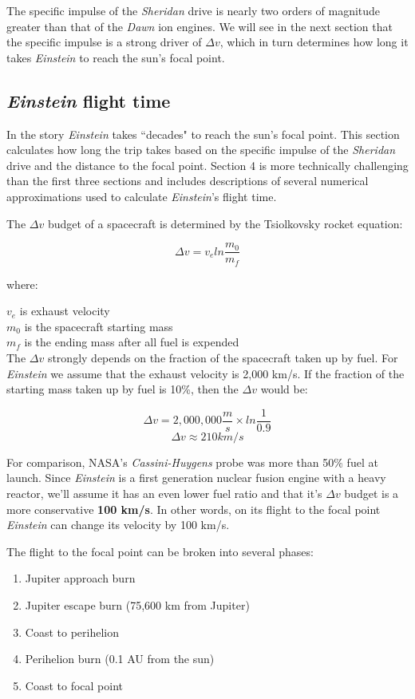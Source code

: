 \documentclass[12pt]{article} %
\begin{document}
The specific impulse of the \textit{Sheridan} drive is nearly two orders of magnitude greater than that of the \textit{Dawn} ion engines. We will see in the next section that the specific impulse is a strong driver of $\Delta v$, which in turn determines how long it takes \textit{Einstein} to reach the sun's focal point.

\subsection{\textit{Einstein} flight time}
\label{subsec: flight time}
In the story \textit{Einstein} takes ``decades" to reach the sun's focal point. This section calculates how long the trip takes based on the specific impulse of the \textit{Sheridan} drive and the distance to the focal point. Section 4 is more technically challenging than the first three sections and includes descriptions of several numerical approximations used to calculate \textit{Einstein}'s flight time.

The $\Delta v$ budget of a spacecraft is determined by the Tsiolkovsky rocket equation:

$$\Delta v = v_e ln \frac{m_0}{m_f}$$

where:

$v_e$ is exhaust velocity\\
$m_0$ is the spacecraft starting mass\\
$m_f$ is the ending mass after all fuel is expended\\

The $\Delta v$ strongly depends on the fraction of the spacecraft taken up by fuel. For \textit{Einstein} we assume that the exhaust velocity is 2,000 km/s. If the fraction of the starting mass taken up by fuel is 10\%, then the $\Delta v$ would be: 

$$\Delta v = 2,000,000\frac{m}{s} \times ln \frac{1}{0.9}$$
$$\Delta v \approx 210 km/s$$ 


For comparison, NASA's \textit{Cassini-Huygens} probe was more than 50\% fuel at launch. Since \textit{Einstein} is a first generation nuclear fusion engine with a heavy reactor, we'll assume it has an even lower fuel ratio and that it's $\Delta v$ budget is a more conservative \textbf{100 km/s}. In other words, on its flight to the focal point \textit{Einstein} can change its velocity by 100 km/s.

The flight to the focal point can be broken into several phases:
\begin{enumerate}
\item Jupiter approach burn
\item Jupiter escape burn (75,600 km from Jupiter)
\item Coast to perihelion 
\item Perihelion burn (0.1 AU from the sun)
\item Coast to focal point
\end{enumerate}
\end{document}
